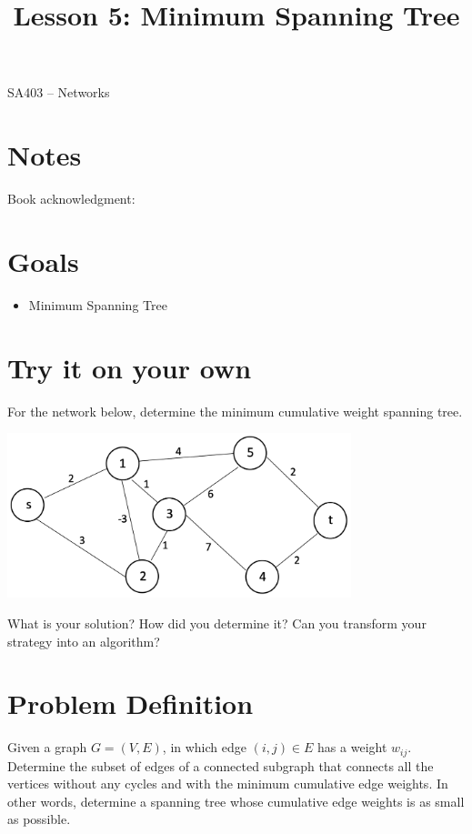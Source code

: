 \documentclass[12pt]{article}
\makeatletter
\theoremstyle{definition}
\newcommand{\graphbox}[5]%
{
\begin{tikzpicture}
     [>=latex,scale=#5]
     
     \draw [->,very thick] (#1, 0) -- (#2, 0) node[right] {$x$};
     \draw [->,very thick] (0, #3) -- (0, #4) node[above] {$y$};
     
     \draw[step=1cm,thick,dotted] (#1,#3) grid (#2,#4);
   \end{tikzpicture}
   }
\renewcommand{\maketitle}{
  \noindent SA403 -- Networks \\

  \begin{center}\Large{\textbf{\@title}}\end{center}
}
\makeatother
\begin{document}

\title{Lesson 5: Minimum Spanning Tree}


\maketitle


\section*{Notes}

Book acknowledgment:
\section*{Goals}
\begin{itemize}
\item Minimum Spanning Tree
\end{itemize}


\section{Try it on your own}

For the network below, determine the minimum cumulative weight spanning tree.

\begin{center}
\includegraphics[width=10cm]{minspanningtree}
\end{center}

\vfill

What is your solution? How did you determine it? Can you transform your strategy into an algorithm?\vfill
\newpage
\section{Problem Definition}

Given a graph $G = (V,E)$, in which edge $(i,j) \in E$ has a weight $w_{ij}$. Determine the subset of edges of a connected subgraph that connects all the vertices without any cycles and with the minimum cumulative edge weights. In other words, determine a spanning tree whose cumulative edge weights is as small as possible.
\end{document}

